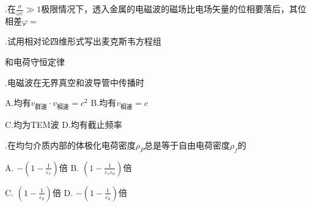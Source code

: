 .\hspace{0.8em}在$\displaystyle{ \frac{\sigma}{\omega \varepsilon} } \gg 1 $极限情况下，透入金属的电磁波的磁场比电场矢量的位相要落后，其位相差$\varphi=$ \vspace{0.2cm}

\noindent
\underline{  \qquad \qquad \qquad \qquad \qquad \qquad}

.\hspace{0.8em}试用相对论四维形式写出麦克斯韦方程组\underline{  \qquad \qquad \qquad  \qquad \qquad \qquad \qquad  \qquad \qquad \qquad \qquad  }

\vspace{0.3cm}
\noindent
和电荷守恒定律\underline{  \qquad \qquad \qquad \qquad \qquad \qquad  \qquad }

\vspace{0.3cm}
.\hspace{0.8em}电磁波在无界真空和波导管中传播时

\vspace{0.2cm}

A.\hspace{0.8em}均有$v_{\text{群速}} \cdot v_{\text{相速}} = c^2$ \hspace{5em}
B.\hspace{0.8em}均有$v_{\text{相速}} = c$  \hspace{3em}
\vspace{0.1cm}

C.\hspace{0.8em}均为TEM波 \hspace{7.9em}
D.\hspace{0.8em}均有截止频率 \vspace{0.2cm}

.\hspace{0.8em}在均匀介质内部的体极化电荷密度$\rho_P$总是等于自由电荷密度$\rho_f$的
\vspace{0.2cm}

A.\hspace{0.8em} $-(1 - \displaystyle{  \frac{1}{ \varepsilon_r } } )$倍 \hspace{8em}
B.\hspace{0.8em} $ (1 - \displaystyle{  \frac{1}{ \varepsilon_r \varepsilon_0 } } )$倍
\vspace{0.2cm}

C.\hspace{0.8em} $ (1 - \displaystyle{  \frac{1}{ \varepsilon_0 } } )$倍 \hspace{8.9em}
D.\hspace{0.8em} $ -(1 - \displaystyle{  \frac{1}{ \varepsilon_0 } } )$倍


